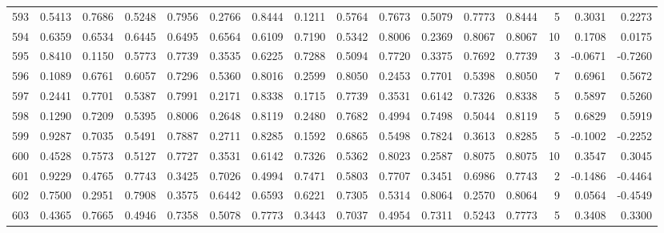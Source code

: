 \begin{tabular}{lrrrrrrrrrrrrrrr}
593 &      0.5413 &  0.7686 &  0.5248 &  0.7956 &  0.2766 &  0.8444 &  0.1211 &  0.5764 &  0.7673 &  0.5079 &   0.7773 &     0.8444 &      5 &                    0.3031 &                     0.2273 \\
594 &      0.6359 &  0.6534 &  0.6445 &  0.6495 &  0.6564 &  0.6109 &  0.7190 &  0.5342 &  0.8006 &  0.2369 &   0.8067 &     0.8067 &     10 &                    0.1708 &                     0.0175 \\
595 &      0.8410 &  0.1150 &  0.5773 &  0.7739 &  0.3535 &  0.6225 &  0.7288 &  0.5094 &  0.7720 &  0.3375 &   0.7692 &     0.7739 &      3 &                   -0.0671 &                    -0.7260 \\
596 &      0.1089 &  0.6761 &  0.6057 &  0.7296 &  0.5360 &  0.8016 &  0.2599 &  0.8050 &  0.2453 &  0.7701 &   0.5398 &     0.8050 &      7 &                    0.6961 &                     0.5672 \\
597 &      0.2441 &  0.7701 &  0.5387 &  0.7991 &  0.2171 &  0.8338 &  0.1715 &  0.7739 &  0.3531 &  0.6142 &   0.7326 &     0.8338 &      5 &                    0.5897 &                     0.5260 \\
598 &      0.1290 &  0.7209 &  0.5395 &  0.8006 &  0.2648 &  0.8119 &  0.2480 &  0.7682 &  0.4994 &  0.7498 &   0.5044 &     0.8119 &      5 &                    0.6829 &                     0.5919 \\
599 &      0.9287 &  0.7035 &  0.5491 &  0.7887 &  0.2711 &  0.8285 &  0.1592 &  0.6865 &  0.5498 &  0.7824 &   0.3613 &     0.8285 &      5 &                   -0.1002 &                    -0.2252 \\
600 &      0.4528 &  0.7573 &  0.5127 &  0.7727 &  0.3531 &  0.6142 &  0.7326 &  0.5362 &  0.8023 &  0.2587 &   0.8075 &     0.8075 &     10 &                    0.3547 &                     0.3045 \\
601 &      0.9229 &  0.4765 &  0.7743 &  0.3425 &  0.7026 &  0.4994 &  0.7471 &  0.5803 &  0.7707 &  0.3451 &   0.6986 &     0.7743 &      2 &                   -0.1486 &                    -0.4464 \\
602 &      0.7500 &  0.2951 &  0.7908 &  0.3575 &  0.6442 &  0.6593 &  0.6221 &  0.7305 &  0.5314 &  0.8064 &   0.2570 &     0.8064 &      9 &                    0.0564 &                    -0.4549 \\
603 &      0.4365 &  0.7665 &  0.4946 &  0.7358 &  0.5078 &  0.7773 &  0.3443 &  0.7037 &  0.4954 &  0.7311 &   0.5243 &     0.7773 &      5 &                    0.3408 &                     0.3300 \\

\end{tabular}
